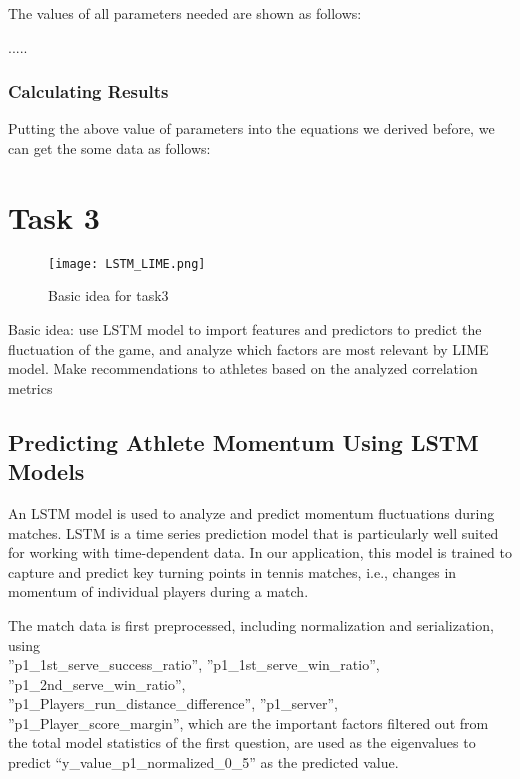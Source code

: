 \documentclass{mcmthesis}
\begin{document}
The values of all parameters needed are shown as follows:

.....

\subsubsection{Calculating Results}

Putting the above value of parameters into the equations we derived before, we can get the some data as follows:


\section{Task 3}
\begin{figure}[!htb]
    \centering
    \texttt{[image: LSTM\_LIME.png]}
    \caption{Basic idea for task3} \label{fig:sample_value}
\end{figure}

Basic idea: use LSTM model to import features and predictors to predict the fluctuation of the game, and analyze which factors are most relevant by LIME model. Make recommendations to athletes based on the analyzed correlation metrics

\subsection{Predicting Athlete Momentum Using LSTM Models}

An LSTM model is used to analyze and predict momentum fluctuations during matches. LSTM is a time series prediction model that is particularly well suited for working with time-dependent data. In our application, this model is trained to capture and predict key turning points in tennis matches, i.e., changes in momentum of individual players during a match.

The match data is first preprocessed, including normalization and serialization, using \\''p1\_1st\_serve\_success\_ratio'', ''p1\_1st\_serve\_win\_ratio'', ''p1\_2nd\_serve\_win\_ratio'',\\ ''p1\_Players\_run\_distance\_difference'', ''p1\_server'', ''p1\_Player\_score\_margin'', which are the important factors filtered out from the total model statistics of the first question, are used as the eigenvalues to predict ``y\_value\_p1\_normalized\_0\_5'' as the predicted value.
\end{document}
